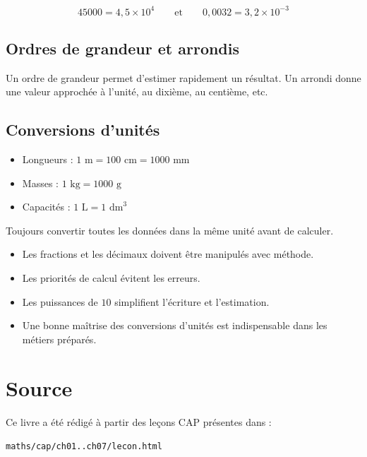 \documentclass[11pt,a4paper,twoside]{book}
\begin{document}
\begin{exemplebox}
\[
45000=4{,}5\times 10^4
\qquad\text{et}\qquad
0{,}0032=3{,}2\times 10^{-3}
\]
\end{exemplebox}

\section{Ordres de grandeur et arrondis}
\begin{definitionbox}
Un ordre de grandeur permet d'estimer rapidement un résultat.
Un arrondi donne une valeur approchée à l'unité, au dixième, au centième, etc.
\end{definitionbox}

\section{Conversions d'unités}
\begin{methodebox}
\begin{itemize}
\item Longueurs : \(1\text{ m}=100\text{ cm}=1000\text{ mm}\)
\item Masses : \(1\text{ kg}=1000\text{ g}\)
\item Capacités : \(1\text{ L}=1\text{ dm}^3\)
\end{itemize}
\end{methodebox}

\begin{attentionbox}
Toujours convertir toutes les données dans la même unité avant de calculer.
\end{attentionbox}

\begin{retenirbox}
\begin{itemize}
\item Les fractions et les décimaux doivent être manipulés avec méthode.
\item Les priorités de calcul évitent les erreurs.
\item Les puissances de \(10\) simplifient l'écriture et l'estimation.
\item Une bonne maîtrise des conversions d'unités est indispensable dans les métiers préparés.
\end{itemize}
\end{retenirbox}

\backmatter

\chapter*{Source}
Ce livre a été rédigé à partir des leçons CAP présentes dans :
\begin{center}
\texttt{maths/cap/ch01..ch07/lecon.html}
\end{center}
\end{document}
